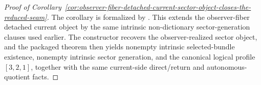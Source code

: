 \begin{proof}[Proof of Corollary~\ref{cor:observer-fiber-detached-current-sector-object-closes-the-reduced-seam}]
\label{proof:cor:observer-fiber-detached-current-sector-object-closes-the-reduced-seam}
The corollary is formalized by
. This extends the
observer-fiber detached current object by the same intrinsic non-dictionary
sector-generation clauses used earlier. The constructor
recovers the observer-realized sector object, and the packaged theorem
 then yields
nonempty intrinsic selected-bundle existence, nonempty intrinsic sector
generation, and the canonical logical profile \([3,2,1]\), together with the
same current-side direct/return and autonomous-quotient facts.
\end{proof}
